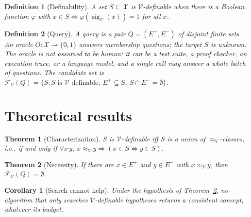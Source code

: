\documentclass[11pt]{article}
\newtheorem{definition}{Definition}
\newtheorem{theorem}{Theorem}
\newtheorem{corollary}{Corollary}
\newcommand{\sig}{\operatorname{sig}}
\newcommand{\Indist}{\approx_{V}}
\newcommand{\Vocab}{\mathcal{V}}
\newcommand{\dom}{\mathcal{X}}
\newcommand{\Epos}{E^{+}}
\newcommand{\Eneg}{E^{-}}
\begin{document}
\begin{definition}[Definability]
A set $S \subseteq \dom$ is \emph{$\Vocab$-definable} when there is a Boolean function
$\varphi$ with $x \in S \iff \varphi(\sig_{\Vocab}(x)) = 1$ for all $x$.
\end{definition}

\begin{definition}[Query]
A query is a pair $Q = (\Epos, \Eneg)$ of disjoint finite sets. An \emph{oracle}
$O \colon \dom \rightharpoonup \{0,1\}$ answers membership questions; the target $S$ is unknown.
The oracle is not assumed to be human: it can be a test suite, a proof checker, an execution
trace, or a language model, and a single call may answer a whole batch of questions. The
\emph{candidate set} is
$\mathcal{F}_{\Vocab}(Q) = \{S : S \text{ is } \Vocab\text{-definable},\ \Epos \subseteq S,\ S \cap \Eneg = \emptyset\}$.
\end{definition}

\section{Theoretical results}

\begin{theorem}[Characterization]\label{thm:char}
$S$ is $\Vocab$-definable iff $S$ is a union of $\Indist$-classes, i.e., if and only if
$\forall x\,y,\ x \Indist y \Rightarrow (x \in S \iff y \in S)$.
\end{theorem}

\begin{theorem}[Necessity]\label{thm:necessary}
If there are $x \in \Epos$ and $y \in \Eneg$ with $x \Indist y$, then
$\mathcal{F}_{\Vocab}(Q) = \emptyset$.
\end{theorem}

\begin{corollary}[Search cannot help]
Under the hypothesis of Theorem~\ref{thm:necessary}, no algorithm that only searches
$\Vocab$-definable hypotheses returns a consistent concept, whatever its budget.
\end{corollary}
\end{document}
